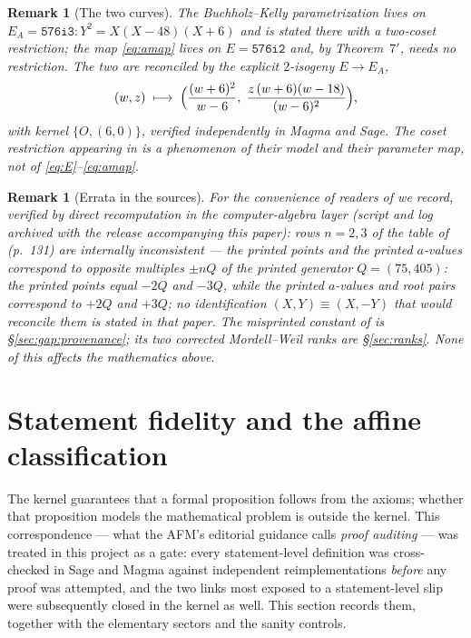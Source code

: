 \documentclass[11pt]{amsart}
\newtheorem{remark}[theorem]{Remark}
\begin{document}
\begin{remark}[The two curves]\label{rem:isogeny}
The Buchholz--Kelly parametrization lives on
$E_A = \texttt{576i3}\colon Y^2 = X(X-48)(X+6)$ and is stated there
with a two-coset restriction; the map \eqref{eq:amap} lives on
$E = \texttt{576i2}$ and, by Theorem~$7'$, needs no restriction.  The
two are reconciled by the explicit $2$-isogeny $E \to E_A$,
\[
(w,z) \;\longmapsto\;
\Bigl( \frac{(w+6)^{2}}{w-6},\;
\frac{z\,(w+6)(w-18)}{(w-6)^{2}} \Bigr),
\]
with kernel $\{O, (6,0)\}$, verified independently in Magma and Sage.
The coset restriction appearing in \cite{BK1995} is a phenomenon of
their model and their parameter map, not of
\eqref{eq:E}--\eqref{eq:amap}.
\end{remark}

\begin{remark}[Errata in the sources]\label{rem:errata}
For the convenience of readers of \cite{BK1995} we record, verified by
direct recomputation in the computer-algebra layer (script and log
archived with the release accompanying this paper): rows $n=2,3$ of the table of \cite{BK1995}
(p.~131) are internally inconsistent --- the printed \emph{points} and
the printed $a$-values correspond to \emph{opposite} multiples $\pm nQ$
of the printed generator $Q=(75,405)$: the printed points equal $-2Q$
and $-3Q$, while the printed $a$-values and root pairs correspond to
$+2Q$ and $+3Q$; no identification $(X,Y)\equiv(X,-Y)$ that would
reconcile them is stated in that paper.  The misprinted constant
of \cite{BM2000} is \S\ref{sec:gap:provenance}; its two corrected
Mordell--Weil ranks are \S\ref{sec:ranks}.  None of this affects the
mathematics above.
\end{remark}

\section{Statement fidelity and the affine classification}
\label{sec:fidelity}

The kernel guarantees that a formal proposition follows from the
axioms; whether that proposition models the mathematical problem is
outside the kernel.  This correspondence --- what the AFM's editorial
guidance calls \emph{proof auditing} --- was treated in this project as
a gate: every statement-level definition was cross-checked in Sage and Magma against
independent reimplementations \emph{before} any proof was attempted,
and the two links most exposed to a statement-level slip were
subsequently closed in the kernel as well.  This section records them,
together with the elementary sectors and the sanity controls.
\end{document}
